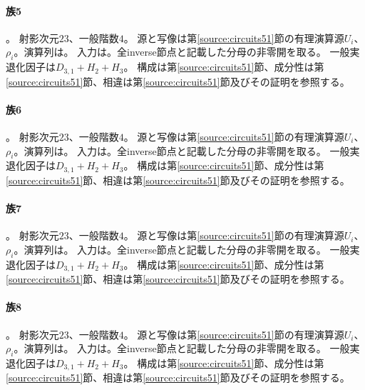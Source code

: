 \paragraph{族5}\label{catalogue:T05}
。
射影次元$23$、一般階数$4$。
源と写像は第\ref{source:circuits51}節の有理演算源$U_i$、$\rho_i$。演算列は。
入力は。全inverse節点と記載した分母の非零開を取る。
一般実退化因子は$D_{3,1}+H_{2}+H_{3}$。
構成は第\ref{source:circuits51}節、成分性は第\ref{source:circuits51}節、相違は第\ref{source:circuits51}節及びその証明を参照する。

\paragraph{族6}\label{catalogue:T06}
。
射影次元$23$、一般階数$4$。
源と写像は第\ref{source:circuits51}節の有理演算源$U_i$、$\rho_i$。演算列は。
入力は。全inverse節点と記載した分母の非零開を取る。
一般実退化因子は$D_{3,1}+H_{2}+H_{3}$。
構成は第\ref{source:circuits51}節、成分性は第\ref{source:circuits51}節、相違は第\ref{source:circuits51}節及びその証明を参照する。

\paragraph{族7}\label{catalogue:T07}
。
射影次元$23$、一般階数$4$。
源と写像は第\ref{source:circuits51}節の有理演算源$U_i$、$\rho_i$。演算列は。
入力は。全inverse節点と記載した分母の非零開を取る。
一般実退化因子は$D_{3,1}+H_{2}+H_{3}$。
構成は第\ref{source:circuits51}節、成分性は第\ref{source:circuits51}節、相違は第\ref{source:circuits51}節及びその証明を参照する。

\paragraph{族8}\label{catalogue:T08}
。
射影次元$23$、一般階数$4$。
源と写像は第\ref{source:circuits51}節の有理演算源$U_i$、$\rho_i$。演算列は。
入力は。全inverse節点と記載した分母の非零開を取る。
一般実退化因子は$D_{3,1}+H_{2}+H_{3}$。
構成は第\ref{source:circuits51}節、成分性は第\ref{source:circuits51}節、相違は第\ref{source:circuits51}節及びその証明を参照する。

